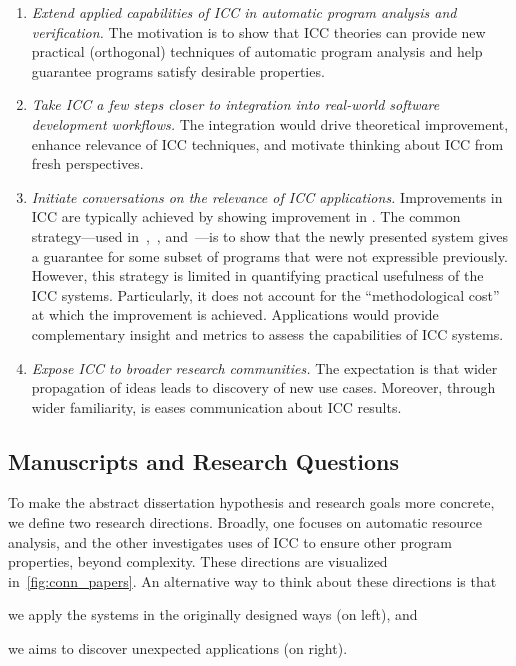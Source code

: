 \begin{enumerate}[label={\textbf{G\arabic*.}}]

\item\emph{Extend applied capabilities of ICC in automatic program analysis and verification.}
The motivation is to show that ICC theories can provide new practical (orthogonal) techniques of automatic program analysis and help guarantee programs satisfy desirable properties.

\item\emph{Take ICC a few steps closer to integration into real-world software development workflows.}
The integration would drive theoretical improvement, enhance relevance of ICC techniques, and motivate thinking about ICC from fresh perspectives.

\item \emph{Initiate conversations on the relevance of ICC applications.}
Improvements in ICC are typically achieved by showing improvement in .
The common strategy---used \eg in~\cite[p.16--17]{hainry2023},~\cite[p. 17]{jones2009}, and~\cite[p. 147]{feree2018}---is to show that the newly presented system gives a guarantee for some subset of programs that were not expressible previously.
However, this strategy is limited in quantifying practical usefulness of the ICC systems.
Particularly, it does not account for the \enquote{methodological cost} at which the improvement is achieved.
Applications would provide complementary insight and metrics to assess the capabilities of ICC systems.

\item \emph{Expose ICC to broader research communities.}
The expectation is that wider propagation of ideas leads to discovery of new use cases.
Moreover, through wider familiarity, is eases communication about ICC results.

\end{enumerate}

\subsection{Manuscripts and Research Questions}
\label{subsec:conn-papers}

To make the abstract dissertation hypothesis and research goals more concrete, we define two research directions.
Broadly, one focuses on automatic resource analysis, and the other investigates uses of ICC to ensure other program properties, beyond complexity.
These directions are visualized in~\autoref{fig:conn_papers}. An alternative way to think about these directions is that
\begin{enumerate*}
\item we apply the systems in the originally designed ways (on left), and
\item we aims to discover unexpected applications (on right).
\end{enumerate*}

